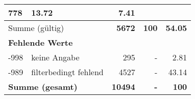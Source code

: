 \begin{longtable}{lXrrr}
       \num{778} &
       \num[round-mode=places,round-precision=2]{13.72} &
         \num[round-mode=places,round-precision=2]{7.41} \\
     \midrule
     \multicolumn{2}{l}{Summe (gültig)} &
       \textbf{\num{5672}} &
     \textbf{\num{100}} &
       \textbf{\num[round-mode=places,round-precision=2]{54.05}} \\
     \multicolumn{5}{l}{\textbf{Fehlende Werte}}\\
       -998 &
       keine Angabe &
         \num{295} &
        - &
         \num[round-mode=places,round-precision=2]{2.81} \\
       -989 &
       filterbedingt fehlend &
         \num{4527} &
        - &
         \num[round-mode=places,round-precision=2]{43.14} \\
     \midrule
     \multicolumn{2}{l}{\textbf{Summe (gesamt)}} &
          \textbf{\num{10494}} &
        \textbf{-} &
        \textbf{\num{100}} \\
     \bottomrule
     \end{longtable}
     
